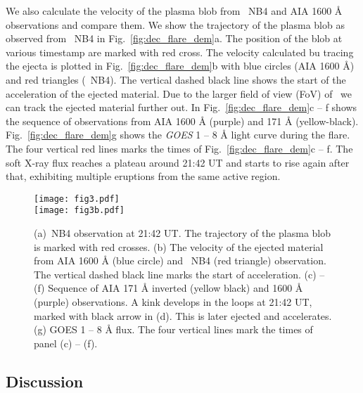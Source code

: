 We also calculate the velocity of the plasma blob from \suit~NB4 and AIA 1600 {\AA} observations and compare them. We show the trajectory of the plasma blob as observed from \suit~NB4 in Fig.~\ref{fig:dec_flare_dem}a. The position of the blob at various timestamp are marked with red cross. The velocity calculated bu tracing the ejecta is plotted in Fig.~\ref{fig:dec_flare_dem}b with blue circles (AIA 1600 {\AA}) and red triangles (\suit~NB4). The vertical dashed black line shows the start of the acceleration of the ejected material. Due to the larger field of view (FoV) of \suit~we can track the ejected material further out. In Fig.~\ref{fig:dec_flare_dem}c {--} f shows the sequence of observations from AIA 1600 {\AA} (purple) and 171 {\AA} (yellow-black). Fig.~\ref{fig:dec_flare_dem}g shows the {\it GOES} 1 {--} 8 {\AA} light curve during the flare. The four vertical red lines marks the times of Fig.~\ref{fig:dec_flare_dem}c {--} f. The soft X-ray flux reaches a plateau around 21:42 UT and starts to rise again after that, exhibiting multiple eruptions from the same active region.

\begin{figure*}[ht!]
    \centering
    \texttt{[image: fig3.pdf]} \\
    \texttt{[image: fig3b.pdf]} \\
    \caption{(a)\suit~NB4 observation at 21:42 UT. The trajectory of the plasma blob is marked with red crosses. (b) The velocity of the ejected material from AIA 1600 {\AA} (blue circle) and \suit~NB4 (red triangle) observation. The vertical dashed black line marks the start of acceleration. (c) {--} (f) Sequence of AIA 171 {\AA} inverted (yellow black) and 1600 {\AA} (purple) observations. A kink develops in the loops at 21:42 UT, marked with black arrow in (d). This is later ejected and accelerates. (g) GOES 1 {--} 8 {\AA} flux. The four vertical lines mark the times of panel (c) {--} (f).}
    \label{fig:dec_flare_vel}
\end{figure*}

\subsection{Discussion} \label{sec:dec_31st_dis}

